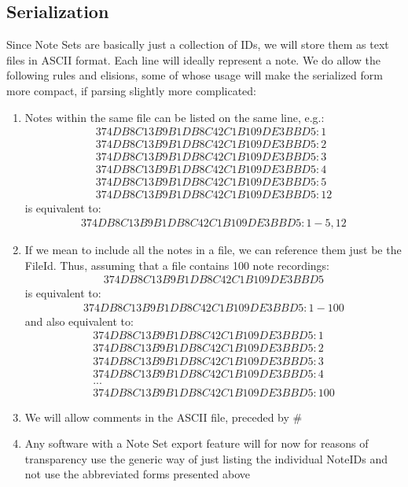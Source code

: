 \subsection{Serialization}
Since Note Sets are basically just a collection of IDs, we will store them as text files in ASCII format. Each line will ideally represent a note. We do allow the following rules and elisions, some of whose usage will make the serialized form more compact, if parsing slightly more complicated:
\begin{enumerate}
\item Notes within the same file can be listed on the same line, e.g.:
\begin{align*}
374DB8C13B9B1DB8C42C1B109DE3BBD5:1 \\
374DB8C13B9B1DB8C42C1B109DE3BBD5:2 \\
374DB8C13B9B1DB8C42C1B109DE3BBD5:3 \\
374DB8C13B9B1DB8C42C1B109DE3BBD5:4 \\
374DB8C13B9B1DB8C42C1B109DE3BBD5:5 \\
374DB8C13B9B1DB8C42C1B109DE3BBD5:12
\end{align*}
is equivalent to:
\begin{align*}
374DB8C13B9B1DB8C42C1B109DE3BBD5:1-5,12
\end{align*}
\item If we mean to include all the notes in a file, we can reference them just be the FileId. Thus, assuming that a file contains 100 note recordings:
\begin{align*}
374DB8C13B9B1DB8C42C1B109DE3BBD5
\end{align*}
is equivalent to:
\begin{align*}
374DB8C13B9B1DB8C42C1B109DE3BBD5:1-100
\end{align*}
and also equivalent to:
\begin{align*}
374DB8C13B9B1DB8C42C1B109DE3BBD5:1 \\
374DB8C13B9B1DB8C42C1B109DE3BBD5:2 \\
374DB8C13B9B1DB8C42C1B109DE3BBD5:3 \\
374DB8C13B9B1DB8C42C1B109DE3BBD5:4 \\
...\\
374DB8C13B9B1DB8C42C1B109DE3BBD5:100
\end{align*}
\item We will allow comments in the ASCII file, preceded by \#
\item Any software with a Note Set export feature will for now for reasons of transparency use the generic way of just listing the individual NoteIDs and not use the abbreviated forms presented above
\end{enumerate}
